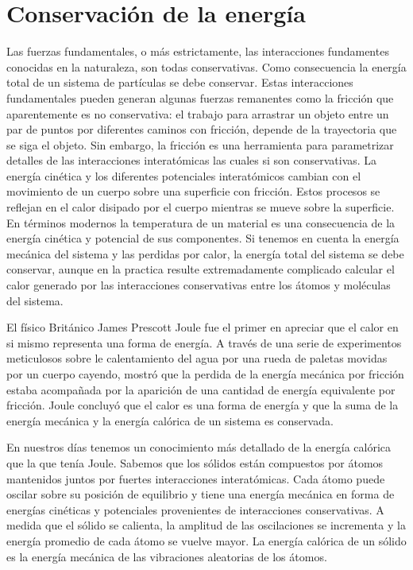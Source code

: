 \section{Conservación de la energía}
Las fuerzas fundamentales, o más estrictamente, las interacciones
fundamentes conocidas en la naturaleza, son todas conservativas. Como
consecuencia la energía total de un sistema de partículas se debe
conservar. Estas interacciones fundamentales pueden generan algunas
fuerzas remanentes como la fricción que aparentemente es no
conservativa: el trabajo para arrastrar un objeto entre un par de
puntos por diferentes caminos con fricción, depende de la trayectoria
que se siga el objeto. Sin embargo, la fricción es una herramienta
para parametrizar detalles de las interacciones interatómicas las
cuales si son conservativas. La energía cinética y los diferentes
potenciales interatómicos cambian con el movimiento de un cuerpo sobre una
superficie con fricción. Estos procesos se reflejan en el calor
disipado por el cuerpo mientras se mueve sobre la superficie. En
términos modernos la temperatura de un material es una consecuencia
de la energía cinética y potencial de sus componentes. Si tenemos en
cuenta la energía mecánica del sistema y las perdidas por calor, la
energía total del sistema se debe conservar, aunque en la practica
resulte extremadamente complicado calcular el calor generado por las
interacciones conservativas entre los átomos y moléculas del sistema.

El físico Británico James Prescott Joule fue el primer en apreciar que
el calor en si mismo representa una forma de energía. A través de una
serie de experimentos meticulosos sobre le calentamiento del agua por
una rueda de paletas movidas por un cuerpo cayendo, mostró que la
perdida de la energía mecánica por fricción estaba acompañada por la
aparición de una cantidad de energía equivalente por fricción. Joule
concluyó que el calor es una forma de energía y que la suma de la
energía mecánica y la energía calórica de un sistema es conservada.

En nuestros días tenemos un conocimiento más detallado de la energía
calórica que la que tenía Joule. Sabemos que los sólidos están
compuestos por átomos mantenidos juntos por fuertes interacciones
interatómicas. Cada átomo puede oscilar sobre su posición de
equilibrio y tiene una energía mecánica en forma de energías cinéticas
y potenciales provenientes de interacciones conservativas. A medida
que el sólido se calienta, la amplitud de las oscilaciones se
incrementa y la energía promedio de cada átomo se vuelve mayor. La
energía calórica de un sólido es la energía mecánica de las
vibraciones aleatorias de los átomos.
   

